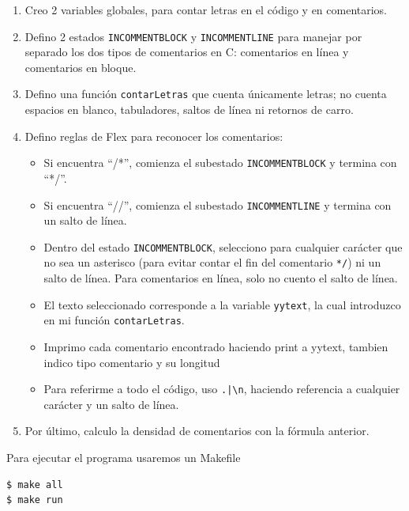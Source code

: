 \documentclass{article}
\begin{document}
        \begin{enumerate}
            \item Creo 2 variables globales, para contar letras en el código y en comentarios.
            \item Defino 2 estados \texttt{INCOMMENTBLOCK} y \texttt{INCOMMENTLINE} para manejar por separado los dos tipos de comentarios en C: comentarios en línea y comentarios en bloque.
            \item Defino una función \texttt{contarLetras} que cuenta únicamente letras; no cuenta espacios en blanco, tabuladores, saltos de línea ni retornos de carro.
            \item Defino reglas de Flex para reconocer los comentarios:
                \begin{itemize}
                    \item Si encuentra ``/*'', comienza el subestado \texttt{INCOMMENTBLOCK} y termina con ``*/''.
                    \item Si encuentra ``//'', comienza el subestado \texttt{INCOMMENTLINE} y termina con un salto de línea.
                    \item Dentro del estado \texttt{INCOMMENTBLOCK}, selecciono para cualquier carácter que no sea un asterisco (para evitar contar el fin del comentario \texttt{*/}) ni un salto de línea. Para comentarios en línea, solo no cuento el salto de línea.
                    \item El texto seleccionado corresponde a la variable \texttt{yytext}, la cual introduzco en mi función \texttt{contarLetras}.
                    \item Imprimo cada comentario encontrado haciendo print a yytext, tambien indico tipo comentario y su longitud
                    \item Para referirme a todo el código, uso \texttt{.|\textbackslash n}, haciendo referencia a cualquier carácter y un salto de línea.

                \end{itemize}
            \item Por último, calculo la densidad de comentarios con la fórmula anterior.
        \end{enumerate}

        \vspace{\baselineskip} %


        Para ejecutar el programa usaremos un Makefile 
    \begin{lstlisting}[frame=single, caption={Ejemplo de ejecución}, captionpos=b]
$ make all 
$ make run 
\end{lstlisting}
\end{document}
